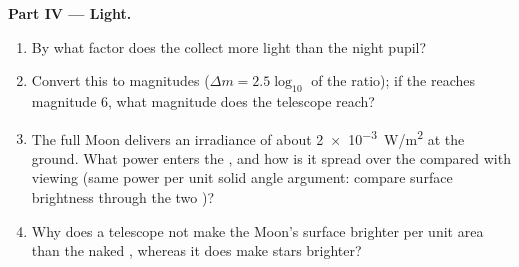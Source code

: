 \begin{problem}
\medskip
\noindent\textbf{Part IV --- Light.}
\begin{enumerate}[resume]
  \item By what factor does the  collect more light than the
        night pupil?
  \item Convert this to magnitudes ($\Delta m = 2.5\log_{10}$ of the
        ratio); if the  reaches magnitude $6$, what magnitude does
        the telescope reach?
  \item The full Moon delivers an irradiance of about
        \qty{2e-3}{W/m^2} at the ground. What power enters the
        , and how is it spread over the  compared with
         viewing (same power per unit solid angle argument:
        compare surface brightness through the two )?
  \item Why does a telescope not make the Moon's surface brighter per
        unit area than the naked , whereas it does make stars
        brighter?
\end{enumerate}


\end{problem}
